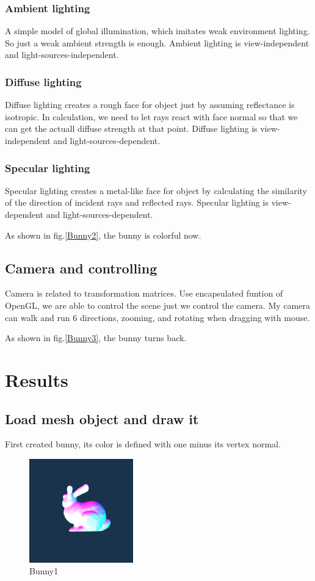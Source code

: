 \documentclass[acmtog]{acmart}
\begin{document}
\subsubsection{Ambient lighting}
A simple model of global illumination, which imitates weak environment lighting.
So just a weak ambient strength is enough.
Ambient lighting is view-independent and light-sources-independent.

\subsubsection{Diffuse lighting}
Diffuse lighting creates a rough face for object just by assuming reflectance is isotropic.
In calculation, we need to let rays react with face normal so that we can get the actuall diffuse strength at that point.
Diffuse lighting is view-independent and light-sources-dependent.

\subsubsection{Specular lighting}
Specular lighting creates a metal-like face for object by calculating the similarity of the direction of incident rays and reflected rays.
Specular lighting is view-dependent and light-sources-dependent.

As shown in fig.\ref{Bunny2}, the bunny is colorful now.

\subsection{Camera and controlling}
Camera is related to transformation matrices. Use encapsulated funtion of OpenGL,
we are able to control the scene just we control the camera.
My camera can walk and run 6 directions, zooming, and rotating when dragging with mouse.

As shown in fig.\ref{Bunny3}, the bunny turns back.

\section{Results}
\subsection{Load mesh object and draw it}
First created bunny, its color is defined with one minus its vertex normal.
\begin{figure}[htb]
	\centering
	\includegraphics[width=0.4\textwidth]{fig/fig1.png}
	\caption{Bunny1}
	\label{Bunny1}
\end{figure}
\end{document}

